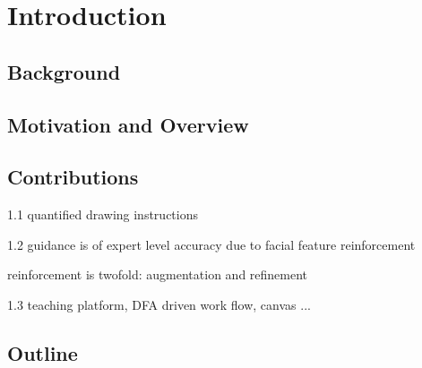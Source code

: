 \chapter{Introduction}\label{sec-introduction}

\section{Background}

\section{Motivation and Overview}

\section{Contributions}
	
		1.1 quantified drawing instructions
	
		1.2 guidance is of expert level accuracy due to facial feature reinforcement
		
				reinforcement is twofold: augmentation and refinement
	
		1.3 teaching platform, DFA driven work flow, canvas ...


\section{Outline}

